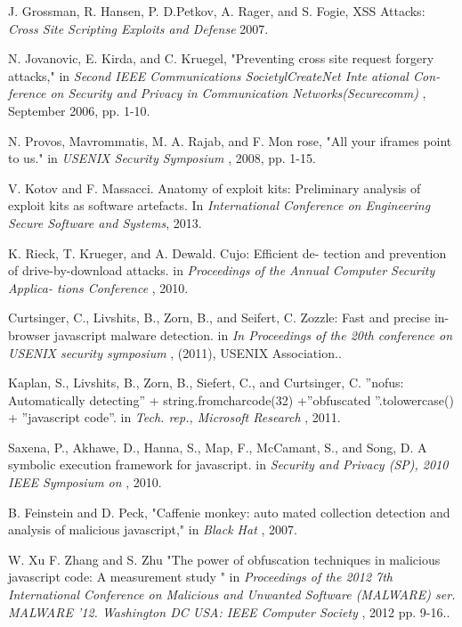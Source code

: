 \documentclass[11pt]{article}
\begin{document}
\newpage
{}
\begin{thebibliography}{9}
J. Grossman, R. Hansen, P. D.Petkov, A. Rager, and S. Fogie, XSS Attacks: 
\textit{Cross Site Scripting Exploits and Defense} 2007.

N. Jovanovic, E. Kirda, and C. Kruegel, "Preventing cross site request forgery attacks," in
\textit{Second IEEE Communications SocietylCreateNet Inte ational Con­ ference on Security and Privacy in Communication Networks(Securecomm)} , September 2006, pp. 1-10.

N. Provos,   Mavrommatis, M. A. Rajab, and F. Mon­ rose, "All your iframes point to us." in
\textit{USENIX Security Symposium} , 2008, pp. 1-15.

V. Kotov and F. Massacci. Anatomy of exploit kits: Preliminary analysis of exploit kits as software artefacts. In
\textit{International Conference on Engineering Secure Software and Systems}, 2013.

K. Rieck, T. Krueger, and A. Dewald. Cujo: Efficient de- tection and prevention of drive-by-download attacks. in
\textit{Proceedings of the Annual Computer Security Applica- tions Conference} , 2010.

Curtsinger, C., Livshits, B., Zorn, B., and Seifert, C. Zozzle: Fast and precise in-browser javascript malware detection. in
\textit{In Proceedings of the 20th conference on USENIX security symposium} , (2011), USENIX Association..

Kaplan, S., Livshits, B., Zorn, B., Siefert, C., and Curtsinger, C. ”nofus: Automatically detecting” + string.fromcharcode(32) +”obfuscated ”.tolowercase() + ”javascript code”. in
\textit{Tech. rep., Microsoft Research} , 2011.

Saxena, P., Akhawe, D., Hanna, S., Map, F., McCamant, S., and Song, D. A symbolic execution framework for javascript. in
\textit{Security and Privacy (SP), 2010 IEEE Symposium on} , 2010.

B. Feinstein and D. Peck, "Caffenie monkey: auto­ mated collection detection and analysis of malicious javascript," in
\textit{Black Hat} , 2007.

W. Xu F. Zhang and S. Zhu "The power of obfuscation techniques in malicious javascript code: A measurement study " in 
\textit{Proceedings of the 2012 7th International Conference on Malicious and Unwanted Software (MALWARE) ser. MALWARE '12. Washington DC USA: IEEE Computer Society } , 2012 pp. 9-16..


\end{thebibliography}
\end{document}
